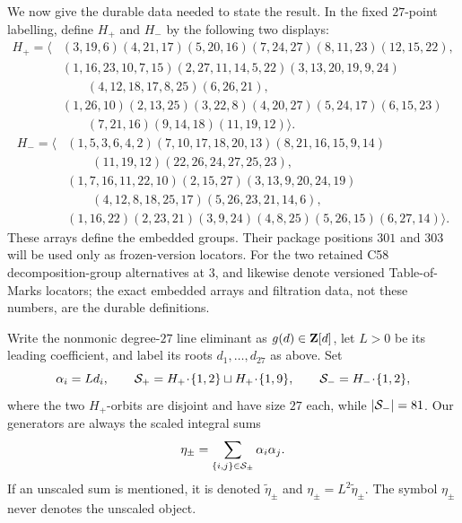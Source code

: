 We now give the durable data needed to state the result.  In the fixed
$27$-point labelling, define $H_+$ and $H_-$ by the following two displays:
\begin{equation}
\begin{aligned}
H_+=\langle
 &(3,19,6)(4,21,17)(5,20,16)(7,24,27)(8,11,23)(12,15,22), \\
 &(1,16,23,10,7,15)(2,27,11,14,5,22)(3,13,20,19,9,24) \\
 &\qquad (4,12,18,17,8,25)(6,26,21), \\
 &(1,26,10)(2,13,25)(3,22,8)(4,20,27)(5,24,17)(6,15,23) \\
 &\qquad (7,21,16)(9,14,18)(11,19,12)
\rangle .
\end{aligned}
\label{eq:Hplus-cycles}
\end{equation}
\begin{equation}
\begin{aligned}
H_-=\langle
 &(1,5,3,6,4,2)(7,10,17,18,20,13)(8,21,16,15,9,14) \\
 &\qquad (11,19,12)(22,26,24,27,25,23), \\
 &(1,7,16,11,22,10)(2,15,27)(3,13,9,20,24,19) \\
 &\qquad (4,12,8,18,25,17)(5,26,23,21,14,6), \\
 &(1,16,22)(2,23,21)(3,9,24)(4,8,25)(5,26,15)(6,27,14)
\rangle .
\end{aligned}
\label{eq:Hminus-cycles}
\end{equation}
These arrays define the embedded groups.  Their package positions $301$ and
$303$ will be used only as frozen-version locators.
For the two retained C58 decomposition-group alternatives at $3$,
 and  likewise denote versioned Table-of-Marks locators;
the exact embedded arrays and filtration data, not these numbers, are the
durable definitions.

Write the nonmonic degree-$27$ line eliminant as $g(d)\in\mathbf{Z}[d]$, let
$L>0$ be its leading coefficient, and label its roots $d_1,\ldots,d_{27}$
as above.  Set
\begin{equation}
  \alpha_i=Ld_i,
  \qquad
  \mathcal{S}_+=H_+\!\cdot\!\{1,2\}\sqcup H_+\!\cdot\!\{1,9\},
  \qquad
  \mathcal{S}_-=H_-\!\cdot\!\{1,2\},
  \label{eq:intro-supports}
\end{equation}
where the two $H_+$-orbits are disjoint and have size $27$ each, while
$|\mathcal{S}_-|=81$.  Our generators are always the scaled integral sums
\begin{equation}
  \eta_\pm=\sum_{\{i,j\}\in\mathcal{S}_\pm}\alpha_i\alpha_j.
  \label{eq:intro-eta}
\end{equation}
If an unscaled sum is mentioned, it is denoted $\widetilde\eta_\pm$ and
$\eta_\pm=L^2\widetilde\eta_\pm$.  The symbol $\eta_\pm$ never denotes
the unscaled object.

